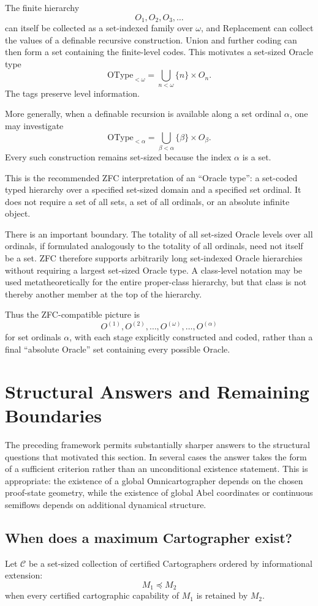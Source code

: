 \documentclass[11pt]{article}
\begin{document}
The finite hierarchy
\[
O_1,O_2,O_3,\ldots
\]
can itself be collected as a set-indexed family over $\omega$, and Replacement can collect the values of a definable recursive construction. Union and further coding can then form a set containing the finite-level codes. This motivates a set-sized Oracle type
\[
\mathrm{OType}_{<\omega}=\bigcup_{n<\omega}\{n\}\times O_n.
\]
The tags preserve level information.

More generally, when a definable recursion is available along a set ordinal $\alpha$, one may investigate
\[
\mathrm{OType}_{<\alpha}=\bigcup_{\beta<\alpha}\{\beta\}\times O_\beta.
\]
Every such construction remains set-sized because the index $\alpha$ is a set.

This is the recommended ZFC interpretation of an ``Oracle type'': a set-coded typed hierarchy over a specified set-sized domain and a specified set ordinal. It does not require a set of all sets, a set of all ordinals, or an absolute infinite object.

There is an important boundary. The totality of all set-sized Oracle levels over all ordinals, if formulated analogously to the totality of all ordinals, need not itself be a set. ZFC therefore supports arbitrarily long set-indexed Oracle hierarchies without requiring a largest set-sized Oracle type. A class-level notation may be used metatheoretically for the entire proper-class hierarchy, but that class is not thereby another member at the top of the hierarchy.

Thus the ZFC-compatible picture is
\[
O^{(1)},O^{(2)},\ldots,O^{(\omega)},\ldots,O^{(\alpha)}
\]
for set ordinals $\alpha$, with each stage explicitly constructed and coded, rather than a final ``absolute Oracle'' set containing every possible Oracle.

\section{Structural Answers and Remaining Boundaries}
The preceding framework permits substantially sharper answers to the structural questions that motivated this section. In several cases the answer takes the form of a sufficient criterion rather than an unconditional existence statement. This is appropriate: the existence of a global Omnicartographer depends on the chosen proof-state geometry, while the existence of global Abel coordinates or continuous semiflows depends on additional dynamical structure.

\subsection{When does a maximum Cartographer exist?}
Let $\mathcal C$ be a set-sized collection of certified Cartographers ordered by informational extension:
\[
M_1\preceq M_2
\]
when every certified cartographic capability of $M_1$ is retained by $M_2$.
\end{document}
